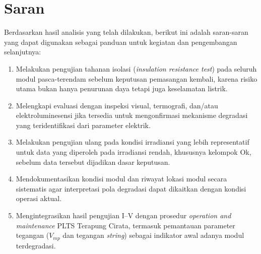 \section{Saran}

Berdasarkan hasil analisis yang telah dilakukan, berikut ini adalah saran-saran
yang dapat digunakan sebagai panduan untuk kegiatan dan pengembangan
selanjutnya:

\begin{enumerate}
    \item Melakukan pengujian tahanan isolasi (\textit{insulation resistance
          test}) pada seluruh modul pasca-terendam sebelum keputusan pemasangan
          kembali, karena risiko utama bukan hanya penurunan daya tetapi juga
          keselamatan listrik.

    \item Melengkapi evaluasi dengan inspeksi visual, termografi, dan/atau
          elektroluminesensi jika tersedia untuk mengonfirmasi mekanisme
          degradasi yang teridentifikasi dari parameter elektrik.

    \item Melakukan pengujian ulang pada kondisi irradiansi yang lebih
          representatif untuk data yang diperoleh pada irradiansi rendah,
          khususnya kelompok Ok, sebelum data tersebut dijadikan dasar
          keputusan.

    \item Mendokumentasikan kondisi modul dan riwayat lokasi modul secara
          sistematis agar interpretasi pola degradasi dapat dikaitkan dengan
          kondisi operasi aktual.

    \item Mengintegrasikan hasil pengujian I--V dengan prosedur
          \textit{operation and maintenance} PLTS Terapung Cirata, termasuk
          pemantauan parameter tegangan ($V_{mp}$ dan tegangan
          \textit{string}) sebagai indikator awal adanya modul terdegradasi.
\end{enumerate}